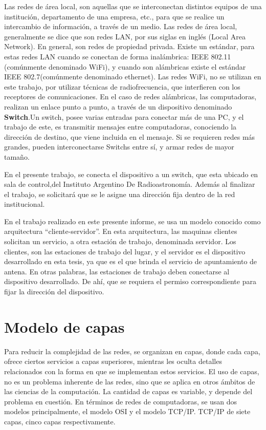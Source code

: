 Las redes de área local, son aquellas que se interconectan distintos equipos de una institución, departamento de una empresa, etc., para que se realice un intercambio de información, a través de un medio. Las redes de área local, generalmente se dice que son redes LAN, por sus siglas en inglés (Local Area Network).  En general, son redes de propiedad privada. Existe un estándar, para estas redes LAN cuando se conectan de forma inalámbrica: IEEE 802.11 (comúnmente denominado WiFi), y cuando son alámbricas existe el estándar IEEE 802.7(comúnmente denominado ethernet). Las redes WiFi, no se utilizan en este trabajo, por utilizar técnicas de radiofrecuencia, que interfieren con los receptores de comunicaciones.  
En el caso de redes alámbricas, las computadoras, realizan un enlace punto a punto, a través de un dispositivo denominado \textbf{Switch}.Un switch, posee varias entradas para conectar más de una PC, y el trabajo de este, es transmitir mensajes entre computadoras, conociendo la dirección de destino, que viene incluida en el mensaje. Si se requieren redes más grandes, pueden interconectarse Switchs entre sí, y armar redes de mayor tamaño. 


En el presente trabajo, se conecta el dispositivo a un switch, que esta ubicado en sala de control,del Instituto Argentino De Radioastronomía. Además al finalizar el trabajo, se solicitará que se le asigne una dirección fija dentro de la red institucional.  

En el trabajo realizado en este presente informe, se  usa un modelo conocido como arquitectura ``cliente-servidor''. En esta arquitectura, las maquinas clientes solicitan un servicio, a otra estación de trabajo, denominada servidor. Los clientes, son las estaciones de trabajo del lugar, y el servidor es el dispositivo desarrollado en esta tesis, ya que es el que brinda el servicio de apuntamiento de antena. En otras palabras, las estaciones de trabajo deben conectarse al dispositivo desarrollado. De ahí, que se requiera el permiso correspondiente para fijar la dirección del dispositivo.  




\section{Modelo de capas}

Para reducir la complejidad de las redes, se organizan en capas, donde cada capa, ofrece ciertos servicios a capas superiores, mientras les oculta detalles relacionados con la forma en que se implementan estos servicios. El uso de capas, no es un problema inherente de las redes, sino que se aplica en otros ámbitos de las ciencias de la computación. La cantidad de capas es variable, y depende del problema en cuestión. En términos de redes de computadoras, se usan dos modelos principalmente, el modelo OSI y el modelo TCP/IP. TCP/IP de siete capas, cinco capas respectivamente. 

